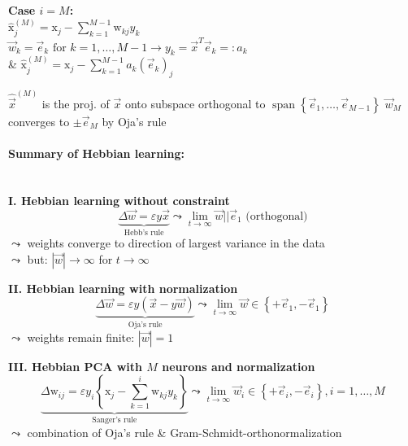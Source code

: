 \vspace{0.1cm}
\textbf{Case $i=M$:}\\
$\hat{\mathrm{x}}_j^{(M)} = \mathrm{x}_j - \sum_{k=1}^{M-1} \mathrm{w}_{kj} y_k$ \\
$\vec{w}_k = \vec{e}_k \text{ for }k=1,\dots, M-1 \rightarrow y_k = \vec{x}^T \vec{e}_k =: a_k$ \\ 
\& $\hat{\mathrm{x}}_j^{(M)} = \mathrm{x}_j - \sum_{k=1}^{M-1} a_k \left( \vec{e}_k \right)_j$ 

\begin{itemize}
\itr $\hat{\vec{x}}^{(M)}$ is the proj. of $\vec{x}$ onto subspace orthogonal to $\operatorname{span}\left\{ \vec{e}_1, \hdots, \vec{e}_{M-1} \right\}$ 
\itr $\vec{w}_M$ converges to $\pm \vec{e}_M$ by Oja's rule
\end{itemize}

\paragraph{Summary of Hebbian learning: }\mbox{}\\
\textbf{I. Hebbian learning without constraint}\\
		\begin{equation*}
			\underbrace{\Delta \vec{w} = \varepsilon y \vec{x}}_{\text{Hebb's rule}} \leadsto \lim\limits_{t \rightarrow \infty} \vec{w} || \vec{e}_1 \text{ (orthogonal)}
		\end{equation*}
$\leadsto$ weights converge to direction of largest variance in the data\\
$\leadsto$ but: $|\vec{w}| \rightarrow \infty$ for $t \rightarrow \infty$

\textbf{II. Hebbian learning with normalization}\\
		\begin{equation*}
			\underbrace{\Delta \vec{w} = \varepsilon y \left( \vec{x} - y \vec{w} \right)}_{\text{Oja's rule}} \leadsto \lim\limits_{t \rightarrow \infty} \vec{w} \in \left\{ +\vec{e}_1, -\vec{e}_1 \right\}
		\end{equation*}
$\leadsto$ weights remain finite: $|\vec{w}| = 1$

\textbf{III. Hebbian PCA with $M$ neurons and normalization}\\
		\begin{equation*}
			\underbrace{\Delta \mathrm{w}_{ij} = \varepsilon y_i \left\{ \mathrm{x}_j - \sum_{k=1}^{i} \mathrm{w}_{kj} y_k \right\} }_{\text{Sanger's rule}} \leadsto \lim\limits_{t \rightarrow \infty} \vec{w}_i \in \left\{ +\vec{e}_i, -\vec{e}_i \right\}, i=1, \hdots, M
		\end{equation*}
		$\leadsto$ combination of Oja's rule \& Gram-Schmidt-orthonormalization




